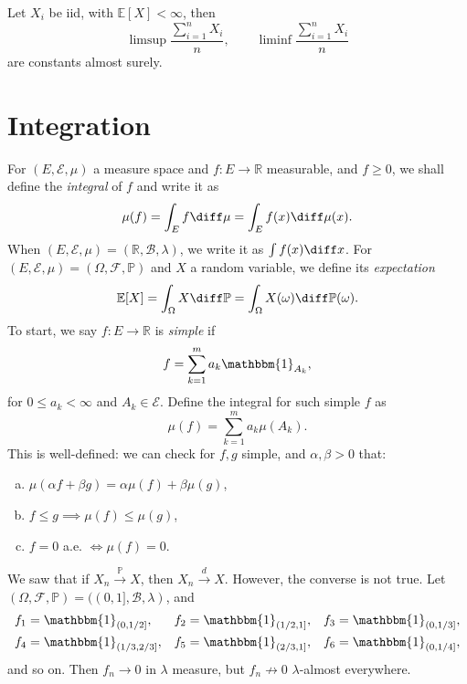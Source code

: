 \documentclass[12pt]{article}
\begin{document}
Let $X_i$ be iid, with $\mathbb{E}[X] < \infty$, then
\[
\limsup \frac{\sum_{i = 1}^{n} X_i}{n}, \qquad \liminf \frac{\sum_{i = 1}^{n} X_i}{n}
\]
are constants almost surely.

\newpage

\section{Integration}
\label{sec:ints}

For $(E, \mathcal{E}, \mu)$ a measure space and $f : E \to \mathbb{R}$ measurable, and $f \geq 0$, we shall define the \emph{integral} of $f$ and write it as
\[
\mu(f) = \int_E f \diff \mu = \int_E f(x) \diff \mu(x).
\]
When $(E, \mathcal{E}, \mu) = (\mathbb{R}, \mathcal{B}, \lambda)$, we write it as $\int f(x) \diff x$. For $(E, \mathcal{E}, \mu) = (\Omega, \mathcal{F}, \mathbb{P})$ and $X$ a random variable, we define its \emph{expectation}
\[
\mathbb{E}[X] = \int_{\Omega} X \diff \mathbb{P} = \int_{\Omega} X(\omega) \diff \mathbb{P}(\omega).
\]
To start, we say $f : E \to \mathbb{R}$ is \emph{simple} if
\[
f = \sum_{k = 1}^{m} a_k \mathbbm{1}_{A_k},
\]
for $0 \leq a_k < \infty$ and $A_k \in \mathcal{E}$. Define the integral for such simple $f$ as
\[
\mu(f) = \sum_{k = 1}^{m} a_k \mu(A_k).
\]
This is well-defined: we can check for $f, g$ simple, and $\alpha, \beta > 0$ that:
\begin{enumerate}[(a)]
	\item $\mu(\alpha f + \beta g) = \alpha \mu(f) + \beta \mu(g)$,
	\item $f \leq g \implies \mu(f) \leq \mu(g)$,
	\item $f = 0$ a.e. $\iff \mu(f) = 0$.
\end{enumerate}


\begin{exbox}
	We saw that if $X_n \overset{\mathbb{P}}{\to} X$, then $X_n \overset{d}{\to} X$. However, the converse is not true. Let $(\Omega, \mathcal{F}, \mathbb{P}) = ((0,1], \mathcal{B}, \lambda)$, and
	\begin{align*}
		f_1 &= \mathbbm{1}_{(0,1/2]}, & f_2 &= \mathbbm{1}_{(1/2,1]}, & f_3 &= \mathbbm{1}_{(0,1/3]},\\
		f_4 &= \mathbbm{1}_{(1/3,2/3]}, & f_5 &= \mathbbm{1}_{(2/3,1]}, & f_6 &= \mathbbm{1}_{(0,1/4]},
	\end{align*}
	and so on. Then $f_n \to 0$ in $\lambda$ measure, but $f_n \not \to 0$ $\lambda$-almost everywhere.
\end{exbox}
\end{document}
